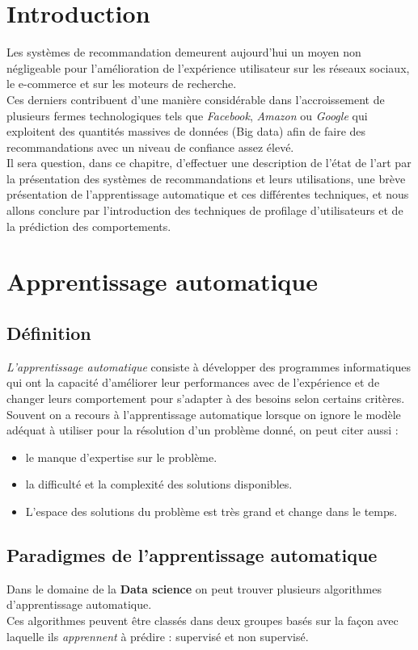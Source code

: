 
\newpage

\section{Introduction}
Les systèmes de recommandation demeurent aujourd'hui un moyen non négligeable pour l'amélioration de l’expérience utilisateur sur les réseaux sociaux, le e-commerce et sur les moteurs de recherche.\\
Ces derniers contribuent d'une manière considérable dans l'accroissement de plusieurs fermes technologiques tels que \emph{Facebook}, \emph{Amazon} ou \emph{Google} qui exploitent des quantités massives de données (Big data) afin de faire des recommandations avec un niveau de confiance assez élevé.\\
Il sera question, dans ce chapitre, d’effectuer une description de l'état de l'art par la présentation des systèmes de recommandations et leurs utilisations, une brève présentation de l'apprentissage automatique et ces différentes techniques, et nous allons conclure par l'introduction des techniques de profilage d'utilisateurs et de la prédiction des comportements.

\section{Apprentissage automatique}
\subsection{Définition}
\emph{L'apprentissage automatique} consiste à développer des programmes informatiques qui ont la capacité d’améliorer leur performances avec de l’expérience et de changer leurs comportement pour s'adapter à des besoins selon certains critères.\\
Souvent on a recours à l'apprentissage automatique lorsque on ignore le modèle adéquat à utiliser pour la résolution d'un problème donné, on peut citer aussi :
\begin{itemize}
    \item le manque d'expertise sur le problème.
    \item la difficulté et la complexité des solutions disponibles. 
    \item L'espace des solutions du problème est très grand et change dans le temps.\cite{guess} 
\end{itemize}

\subsection{Paradigmes de l'apprentissage automatique}
Dans le domaine de la \textbf{Data science} on peut trouver plusieurs algorithmes d'apprentissage automatique.\\Ces algorithmes peuvent être classés dans deux groupes basés sur la façon avec laquelle ils \emph{apprennent} à prédire : supervisé et non supervisé.

